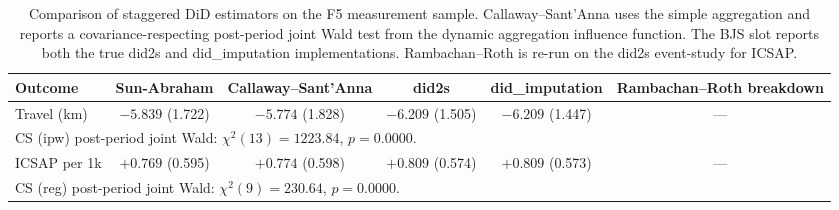 \begin{table}[h!]
\centering
\caption{Comparison of staggered DiD estimators on the F5 measurement sample. Callaway--Sant'Anna uses the simple aggregation and reports a covariance-respecting post-period joint Wald test from the dynamic aggregation influence function. The BJS slot reports both the true did2s and did_imputation implementations. Rambachan--Roth is re-run on the did2s event-study for ICSAP.}
\label{tab:staggered-did-compare}
\small
\begin{tabular}{lccccc}
\toprule
Outcome & Sun-Abraham & Callaway--Sant'Anna & did2s & did\_imputation & Rambachan--Roth breakdown \\
\midrule
Travel (km) & $-5.839$ (1.722) & $-5.774$ (1.828) & $-6.209$ (1.505) & $-6.209$ (1.447) & --- \\
\multicolumn{6}{l}{\footnotesize CS (ipw) post-period joint Wald: $\chi^2(13)=1223.84$, $p=0.0000$.} \\
ICSAP per 1k & $+0.769$ (0.595) & $+0.774$ (0.598) & $+0.809$ (0.574) & $+0.809$ (0.573) & --- \\
\multicolumn{6}{l}{\footnotesize CS (reg) post-period joint Wald: $\chi^2(9)=230.64$, $p=0.0000$.} \\
\bottomrule
\end{tabular}
\end{table}
